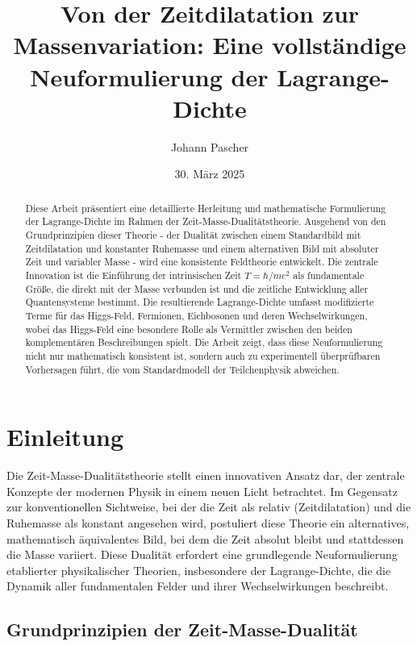 \documentclass{article}
\title{Von der Zeitdilatation zur Massenvariation: Eine vollständige Neuformulierung der Lagrange-Dichte}
\author{Johann Pascher}
\date{30. März 2025}
\theoremstyle{definition}
\theoremstyle{remark}
\begin{document}
		
		\maketitle
		
		\begin{abstract}
			Diese Arbeit präsentiert eine detaillierte Herleitung und mathematische Formulierung der Lagrange-Dichte im Rahmen der Zeit-Masse-Dualitätstheorie. Ausgehend von den Grundprinzipien dieser Theorie - der Dualität zwischen einem Standardbild mit Zeitdilatation und konstanter Ruhemasse und einem alternativen Bild mit absoluter Zeit und variabler Masse - wird eine konsistente Feldtheorie entwickelt. Die zentrale Innovation ist die Einführung der intrinsischen Zeit $T = \hbar/mc^2$ als fundamentale Größe, die direkt mit der Masse verbunden ist und die zeitliche Entwicklung aller Quantensysteme bestimmt. Die resultierende Lagrange-Dichte umfasst modifizierte Terme für das Higgs-Feld, Fermionen, Eichbosonen und deren Wechselwirkungen, wobei das Higgs-Feld eine besondere Rolle als Vermittler zwischen den beiden komplementären Beschreibungen spielt. Die Arbeit zeigt, dass diese Neuformulierung nicht nur mathematisch konsistent ist, sondern auch zu experimentell überprüfbaren Vorhersagen führt, die vom Standardmodell der Teilchenphysik abweichen.
		\end{abstract}
		
		\tableofcontents
		\newpage
		
		\section{Einleitung}
		
		Die Zeit-Masse-Dualitätstheorie stellt einen innovativen Ansatz dar, der zentrale Konzepte der modernen Physik in einem neuen Licht betrachtet. Im Gegensatz zur konventionellen Sichtweise, bei der die Zeit als relativ (Zeitdilatation) und die Ruhemasse als konstant angesehen wird, postuliert diese Theorie ein alternatives, mathematisch äquivalentes Bild, bei dem die Zeit absolut bleibt und stattdessen die Masse variiert. Diese Dualität erfordert eine grundlegende Neuformulierung etablierter physikalischer Theorien, insbesondere der Lagrange-Dichte, die die Dynamik aller fundamentalen Felder und ihrer Wechselwirkungen beschreibt.
		
		\subsection{Grundprinzipien der Zeit-Masse-Dualität}
		
\end{document}
